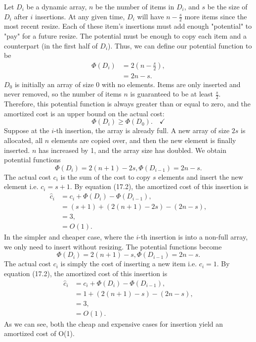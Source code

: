 \documentclass[11pt]{article}
\begin{document}
Let $D_i$ be a dynamic array, $n$ be the number of items in $D_i$, and $s$ be the size of $D_i$ after $i$ insertions. At any given time, $D_i$ will have $n - \frac{s}{2}$ more items since the most recent resize.  Each of these item's insertions must add enough "potential" to "pay" for a future resize. The potential must be enough to copy each item and a counterpart (in the first half of $D_i$). Thus, we can define our potential function to be
\begin{align*}
    \Phi (D_i) & = 2(n - \frac{s}{2}),\\
    & = 2n - s.
\end{align*}
$D_0$ is initially an array of size 0 with no elements. Items are only inserted and never removed, so the number of items $n$ is guaranteed to be at least $\frac{s}{2}$. Therefore, this potential function is always greater than or equal to zero, and the amortized cost is an upper bound on the actual cost:
\begin{equation*}
 \Phi (D_i) \geq  \Phi (D_0). \quad \checkmark
\end{equation*}
Suppose at the $i$-th insertion, the array is already full. A new array of size $2s$ is allocated, all $n$ elements are copied over, and then the new element is finally inserted. $n$ has increased by 1, and the array size has doubled. We obtain potential functions
\begin{equation*}
    \Phi (D_i) = 2(n + 1) - 2s, \Phi (D_{i-1}) = 2n - s.
\end{equation*}
The actual cost $c_i$ is the sum of the cost to copy $s$ elements and insert the new element i.e. $c_i=s + 1$. By equation (17.2), the amortized cost of this insertion is
\begin{align*}
    \hat{c}_i & = c_i + \Phi (D_i) - \Phi (D_{i-1}),\\
    & = (s + 1) + (2(n + 1) - 2s) - (2n - s),\\
    & = 3,\\
    & = O(1).
\end{align*}
In the simpler and cheaper case, where the $i$-th insertion is into a non-full array, we only need to insert without resizing. The potential functions become
\begin{equation*}
    \Phi (D_i) = 2(n + 1) - s, \Phi (D_{i-1}) = 2n - s.
\end{equation*}
The actual cost $c_i$ is simply the cost of inserting a new item i.e. $c_i=1$. By equation (17.2), the amortized cost of this insertion is
\begin{align*}
    \hat{c}_i & = c_i + \Phi (D_i) - \Phi (D_{i-1}),\\
    & = 1 + (2(n + 1) - s) - (2n - s),\\
    & = 3,\\
    & = O(1).
\end{align*}
As we can see, both the cheap and expensive cases for insertion yield an amortized cost of O(1).
\end{document}
